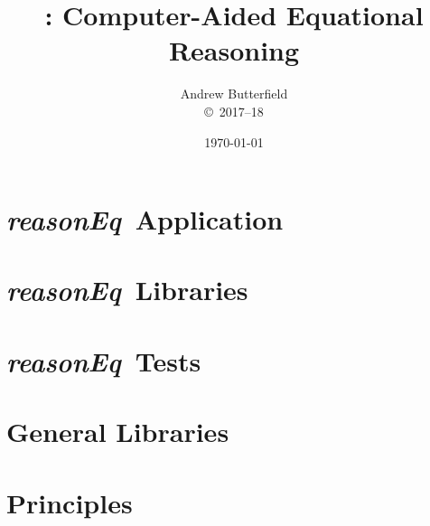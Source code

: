 \documentclass[fleqn,10pt]{report}
\author{
Andrew Butterfield
\\
{\small \copyright\ 2017--18}
}
\title{
  \reasonEq: Computer-Aided Equational Reasoning
}
\date{
\today
}
\def\reasonEq{\textit{\textsf{reasonEq}}}
\begin{document}
\maketitle
\tableofcontents

\chapter{\reasonEq\ Application}



\chapter{\reasonEq\ Libraries}


\newpage

\newpage

\newpage

\newpage

\newpage

\newpage

\newpage

\newpage


\chapter{\reasonEq\ Tests}


\newpage


\chapter{General Libraries}






\appendix

\chapter{Principles}


\end{document}
